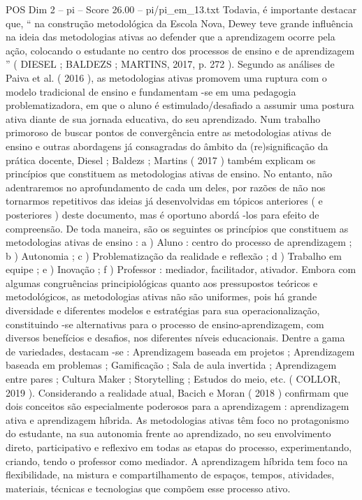 \begin{textsample}{POS Dim 2 – pi – Score 26.00 – pi/pi\_em\_13.txt}
Todavia, é importante destacar que, “ na construção metodológica da Escola Nova, Dewey teve grande influência na ideia das metodologias ativas ao defender que a aprendizagem ocorre pela ação, colocando o estudante no centro dos processos de ensino e de aprendizagem ” ( DIESEL ; BALDEZS ; MARTINS, 2017, p. 272 ).
Segundo as análises de Paiva et al. ( 2016 ), as metodologias ativas promovem uma ruptura com o modelo tradicional de ensino e fundamentam -se em uma pedagogia problematizadora, em que o aluno é estimulado/desafiado a assumir uma postura ativa diante de sua jornada educativa, do seu aprendizado.
Num trabalho primoroso de buscar pontos de convergência entre as metodologias ativas de ensino e outras abordagens já consagradas do âmbito da (re)significação da prática docente, Diesel ; Baldezs ; Martins ( 2017 ) também explicam os princípios que constituem as metodologias ativas de ensino.
No entanto, não adentraremos no aprofundamento de cada um deles, por razões de não nos tornarmos repetitivos das ideias já desenvolvidas em tópicos anteriores ( e posteriores ) deste documento, mas é oportuno abordá -los para efeito de compreensão.
De toda maneira, são os seguintes os princípios que constituem as metodologias ativas de ensino : a ) Aluno : centro do processo de aprendizagem ; b ) Autonomia ; c ) Problematização da realidade e reflexão ; d ) Trabalho em equipe ; e ) Inovação ; f ) Professor : mediador, facilitador, ativador.
Embora com algumas congruências principiológicas quanto aos pressupostos teóricos e metodológicos, as metodologias ativas não são uniformes, pois há grande diversidade e diferentes modelos e estratégias para sua operacionalização, constituindo -se alternativas para o processo de ensino-aprendizagem, com diversos benefícios e desafios, nos diferentes níveis educacionais.
Dentre a gama de variedades, destacam -se : Aprendizagem baseada em projetos ; Aprendizagem baseada em problemas ; Gamificação ; Sala de aula invertida ; Aprendizagem entre pares ; Cultura Maker ; Storytelling ; Estudos do meio, etc. ( COLLOR, 2019 ).
Considerando a realidade atual, Bacich e Moran ( 2018 ) confirmam que dois conceitos são especialmente poderosos para a aprendizagem : aprendizagem ativa e aprendizagem híbrida.
As metodologias ativas têm foco no protagonismo do estudante, na sua autonomia frente ao aprendizado, no seu envolvimento direto, participativo e reflexivo em todas as etapas do processo, experimentando, criando, tendo o professor como mediador.
A aprendizagem híbrida tem foco na flexibilidade, na mistura e compartilhamento de espaços, tempos, atividades, materiais, técnicas e tecnologias que compõem esse processo ativo.

\end{textsample}
